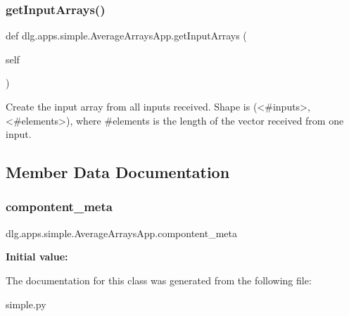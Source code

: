 \subsubsection{\texorpdfstring{getInputArrays()}{getInputArrays()}}
{\footnotesize\ttfamily def dlg.\+apps.\+simple.\+Average\+Arrays\+App.\+get\+Input\+Arrays (\begin{DoxyParamCaption}\item[{}]{self }\end{DoxyParamCaption})}

\begin{DoxyVerb}Create the input array from all inputs received. Shape is
(<#inputs>, <#elements>), where #elements is the length of the
vector received from one input.
\end{DoxyVerb}
 

\subsection{Member Data Documentation}
\mbox{\label{classdlg_1_1apps_1_1simple_1_1_average_arrays_app_ae58ff9997313accbdddb70c5e2e3d4c8}} 
\subsubsection{\texorpdfstring{compontent\_meta}{compontent\_meta}}
{\footnotesize\ttfamily dlg.\+apps.\+simple.\+Average\+Arrays\+App.\+compontent\+\_\+meta\hspace{0.3cm}{\ttfamily [static]}}

{\bfseries Initial value\+:}
\begin{DoxyCode}{0}

\end{DoxyCode}


The documentation for this class was generated from the following file\+:\begin{DoxyCompactItemize}
\item 
simple.\+py\end{DoxyCompactItemize}
